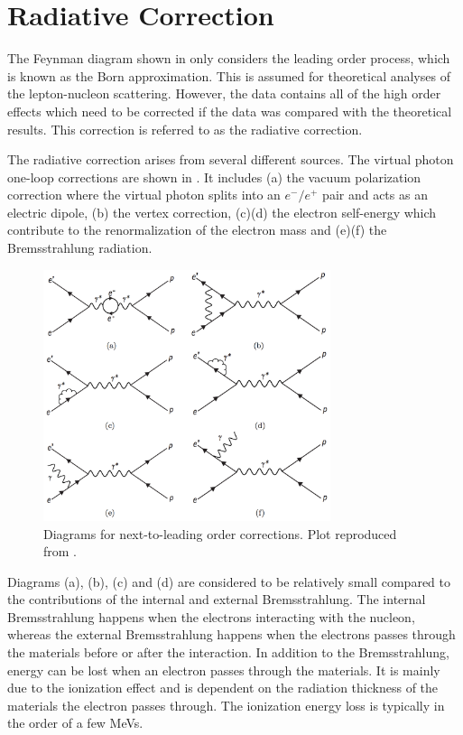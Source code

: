 \section{Radiative Correction}
\label{C8S2}

The Feynman diagram shown in  only considers the leading order process, which is known as the Born approximation. This is assumed for theoretical analyses of the lepton-nucleon scattering. However, the data contains all of the high order effects which need to be corrected if the data was compared with the theoretical results. This correction is referred to as the radiative correction.

The radiative correction arises from several different sources. The virtual photon one-loop corrections are shown in . It includes (a) the vacuum polarization correction where the virtual photon splits into an $e^-/e^+$ pair and acts as an electric dipole, (b) the vertex correction, (c)(d) the electron self-energy which contribute to the renormalization of the electron mass and (e)(f) the Bremsstrahlung radiation.

\begin{figure}[tb!]
  \centering
  \includegraphics[width=0.75\textwidth]{figs/one-loop-corrections.png}
  \caption[Diagrams for next-to-leading order corrections.]{Diagrams for next-to-leading order corrections. Plot reproduced from \cite{Zielinski2014b}. \label{C8S2F1}}
\end{figure}

Diagrams (a), (b), (c) and (d) are considered to be relatively small compared to the contributions of the internal and external Bremsstrahlung. The internal Bremsstrahlung happens when the electrons interacting with the nucleon, whereas the external Bremsstrahlung happens when the electrons passes through the materials before or after the interaction. In addition to the Bremsstrahlung, energy can be lost when an electron passes through the materials. It is mainly due to the ionization effect and is dependent on the radiation thickness of the materials the electron passes through. The ionization energy loss is typically in the order of a few MeVs.


